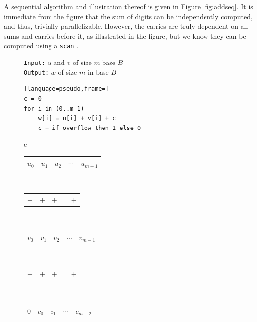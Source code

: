 A sequential algorithm and illustration thereof is given in Figure
\ref{fig:addseq}. It is immediate from the figure that the sum of digits can be
independently computed, and thus, trivially parallelizable. However, the carries
are truly dependent on all sums and carries before it, as illustrated in the
figure, but we know they can be computed using a \texttt{scan}
\cite{blellochaddscan}.

\begin{figure}
  \centering
  \begin{minipage}{0.45\textwidth}
    \small
    \texttt{Input:} $u$ and $v$ of size $m$ base $B$\\
    \texttt{Output:} $w$ of size $m$ in base $B$
\begin{lstlisting}[language=pseudo,frame=]
c = 0
for i in (0..m-1)
    w[i] = u[i] + v[i] + c
    c = if overflow then 1 else 0
\end{lstlisting}
  \end{minipage}
  \begin{minipage}{0.45\textwidth}
    \centering
    \footnotesize
    \begin{tabular}{c}
      \begin{tabular}{|C{0.7cm}|C{0.7cm}|C{0.7cm}|C{0.7cm}|C{0.7cm}|}
        \hline
        $u_0$ & $u_1$ & $u_2$ & $\cdots$ & $u_{m-1}$\\ 
        \hline
      \end{tabular}\\
      \begin{tabular}{C{0.7cm}C{0.7cm}C{0.7cm}C{0.7cm}C{0.7cm}}
        $+$ & $+$ & $+$ & & $+$\\ 
      \end{tabular}\\
      \begin{tabular}{|C{0.7cm}|C{0.7cm}|C{0.7cm}|C{0.7cm}|C{0.7cm}|}
        \hline
        $v_0$ & $v_1$ & $v_2$ & $\cdots$ & $v_{m-1}$\\
        \hline
      \end{tabular}\\
      \begin{tabular}{C{0.7cm}C{0.7cm}C{0.7cm}C{0.7cm}C{0.7cm}}
        $+$ & $+$ & $+$ &  & $+$\\
      \end{tabular}\\
      \begin{tabular}{C{0.7cm}C{0.7cm}C{0.7cm}C{0.7cm}C{0.7cm}}
        $0$ & $c_0$ &  $c_1$ & $\cdots$ &$c_{m-2}$ \\

\end{tabular}
\end{tabular}
\end{minipage}
\end{figure}

